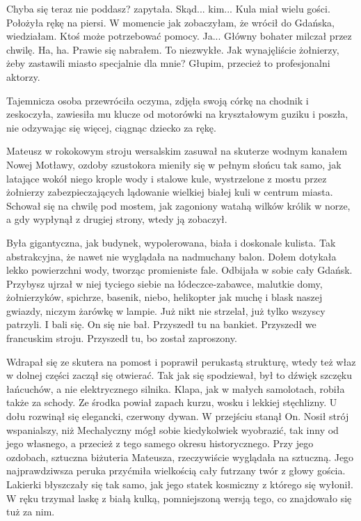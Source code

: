 \begin{dialogue}
\ds{} Chyba się teraz nie poddasz? \dm{} zapytała.
\ds{} Skąd... kim...
\ds{} Kula miał wielu gości. \dm{} Położyła rękę na piersi. \dm{} W momencie jak zobaczyłam, że wrócił do Gdańska, wiedziałam. Ktoś może potrzebować pomocy.
\ds{} Ja... \dm{} Główny bohater milczał przez chwilę. \dm{} Ha, ha. Prawie się nabrałem.
To niezwykłe. Jak wynajęliście żołnierzy, żeby zastawili miasto specjalnie dla mnie? Głupim, przecież to profesjonalni aktorzy.
\end{dialogue}

Tajemnicza osoba przewróciła oczyma, zdjęła swoją córkę na chodnik i zeskoczyła, zawiesiła mu klucze od motorówki na kryształowym guziku i poszła, nie odzywając się więcej, ciągnąc dziecko za rękę.

Mateusz w rokokowym stroju wersalskim zasuwał na skuterze wodnym kanałem Nowej Motławy, ozdoby szustokora mieniły się w pełnym słońcu tak samo, jak latające wokół niego
krople wody i stalowe kule, wystrzelone z mostu przez żołnierzy zabezpieczających lądowanie wielkiej białej kuli w centrum miasta.
Schował się na chwilę pod mostem, jak zagoniony watahą wilków królik w norze, a gdy wypłynął z drugiej strony, wtedy ją zobaczył.

Była gigantyczna, jak budynek, wypolerowana, biała i doskonale kulista. Tak abstrakcyjna, że nawet nie wyglądała na nadmuchany balon.
Dołem dotykała lekko powierzchni wody, tworząc promieniste fale.
Odbijała w sobie cały Gdańsk.
Przybysz ujrzał w niej tyciego siebie na łódeczce-zabawce, malutkie domy, żołnierzyków, spichrze, basenik, niebo, helikopter jak muchę i blask naszej gwiazdy, niczym żarówkę w lampie.
Już nikt nie strzelał, już tylko wszyscy patrzyli. I bali się.
On się nie bał. 
Przyszedł tu na bankiet.
Przyszedł we francuskim stroju.
Przyszedł tu, bo został zaproszony.

Wdrapał się ze skutera na pomost i poprawił perukastą strukturę, wtedy też właz w dolnej części zaczął się otwierać.
Tak jak się spodziewał, był to dźwięk szczęku łańcuchów, a nie elektrycznego silnika. Klapa, jak w małych samolotach, robiła także za schody.
Ze środka powiał zapach kurzu, wosku i lekkiej stęchlizny.
U dołu rozwinął się elegancki, czerwony dywan.
W przejściu stanął On.
Nosił strój wspanialszy, niż Mechalyczny mógł sobie kiedykolwiek wyobrazić, tak inny od jego własnego, a przecież z tego samego okresu historycznego.
Przy jego ozdobach, sztuczna biżuteria Mateusza, rzeczywiście wyglądała na sztuczną.
Jego najprawdziwsza peruka przyćmiła wielkością cały futrzany twór z głowy gościa.
Lakierki błyszczały się tak samo, jak jego statek kosmiczny z którego się wyłonił.
W ręku trzymał laskę z białą kulką, pomniejszoną wersją tego, co znajdowało się tuż za nim.

